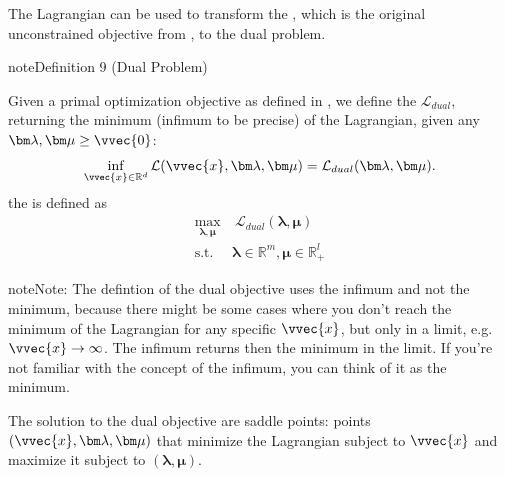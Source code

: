 \documentclass[letterpaper,10pt,english]{jupyterBook}
\begin{document}
\sphinxAtStartPar
The Lagrangian can be used to transform the , which is the original unconstrained objective from {\hyperref[\detokenize{optimization_problems:constr_objective}]{}}, to the dual problem.
\label{optimization_problems:dual_problem}
\begin{sphinxadmonition}{note}{Definition 9 (Dual Problem)}



\sphinxAtStartPar
Given a primal optimization objective as defined in {\hyperref[\detokenize{optimization_problems:constr_objective}]{}}, we define the  \(\mathcal{L}_{dual}\), returning the minimum (infimum to be precise) of the Lagrangian, given any \(\bm\lambda,\bm\mu\geq\vvec{0}\):
\begin{equation*}
\begin{split}\inf_{\vvec{x}\in\mathbb{R}^d}\mathcal{L}(\vvec{x},\bm\lambda,\bm\mu) = \mathcal{L}_{dual}(\bm\lambda,\bm\mu).\end{split}
\end{equation*} the  is defined as
\begin{align*}
\max_{\bm\lambda, \bm\mu }&\ \mathcal{L}_{dual}(\bm\lambda,\bm\mu) \\
\text{s.t. }& \bm\lambda\in\mathbb{R}^m, \bm\mu\in\mathbb{R}_+^l
\end{align*}\end{sphinxadmonition}

\begin{sphinxadmonition}{note}{Note:}
\sphinxAtStartPar
The defintion of the dual objective uses the infimum and not the minimum, because there might be some cases where you don’t reach the minimum of the Lagrangian for any specific \(\vvec{x}\), but only in a limit, e.g. \(\vvec{x}\rightarrow\infty\). The infimum returns then the minimum in the limit. If you’re not familiar with the concept of the infimum, you can think of it as the minimum.
\end{sphinxadmonition}

\sphinxAtStartPar
The solution to the dual objective are saddle points: points \((\vvec{x},\bm\lambda,\bm\mu)\) that minimize the Lagrangian subject to \(\vvec{x}\) and maximize it subject to \((\bm\lambda,\bm\mu)\).
\end{document}
